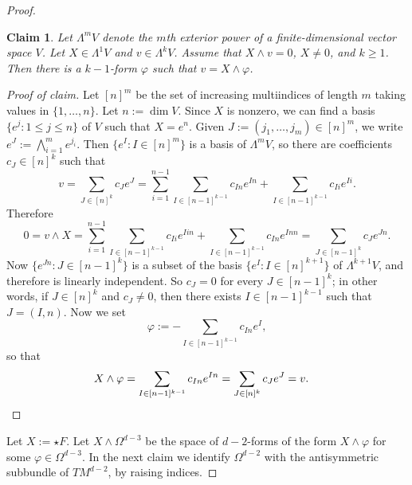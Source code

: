 \documentclass[reqno,11pt]{amsart}
\newtheorem{claim}{Claim}[theorem]
\theoremstyle{definition}
\numberwithin{equation}{section}
\begin{document}
\begin{proof}
\begin{claim}\label{exterior splitting lemma}
Let $\Lambda^m V$ denote the $m$th exterior power of a finite-dimensional vector space $V$.
Let $X \in \Lambda^1 V$ and $v \in \Lambda^k V$.
Assume that $X \wedge v = 0$, $X \neq 0$, and $k \geq 1$.
Then there is a $k - 1$-form $\varphi$ such that $v = X \wedge \varphi$.
\end{claim}
\begin{proof}[Proof of claim]
Let $[n]^m$ be the set of increasing multiindices of length $m$ taking values in $\{1, \dots, n\}$.
Let $n := \dim V$.
Since $X$ is nonzero, we can find a basis $\{e^j: 1 \leq j \leq n\}$ of $V$ such that $X = e^n$.
Given $J := (j_1, \dots, j_m) \in [n]^m$, we write $e^J := \bigwedge_{i=1}^m e^{j_i}$.
Then $\{e^I: I \in [n]^m\}$ is a basis of $\Lambda^m V$, so there are coefficients $c_J \in [n]^k$ such that
$$v = \sum_{J \in [n]^k} c_J e^J = \sum_{i=1}^{n - 1} \sum_{I \in [n - 1]^{k - 1}} c_{In} e^{In} + \sum_{I \in [n - 1]^{k - 1}} c_{Ii} e^{Ii}.$$
Therefore 
$$0 = v \wedge X = \sum_{i=1}^{n - 1} \sum_{I \in [n - 1]^{k - 1}} c_{Ii} e^{Iin} + \sum_{I \in [n - 1]^{k - 1}} c_{In} e^{Inn} = \sum_{J \in [n - 1]^k} c_J e^{Jn}.$$
Now $\{e^{Jn}: J \in [n-1]^k\}$ is a subset of the basis $\{e^I: I \in [n]^{k + 1}\}$ of $\Lambda^{k + 1} V$, and therefore is linearly independent.
So $c_J = 0$ for every $J \in [n - 1]^k$; in other words, if $J \in [n]^k$ and $c_J \neq 0$, then there exists $I \in [n - 1]^{k - 1}$ such that $J = (I, n)$.
Now we set
$$\varphi := -\sum_{I \in [n - 1]^{k - 1}} c_{In} e^I,$$
so that 
\begin{align*} 
X \wedge \varphi &= \sum_{I \in [n - 1]^{k - 1}} c_{In} e^{In} = \sum_{J \in [n]^k} c_J e^J = v. \qedhere 
\end{align*}
\end{proof}

Let $X := \star F$.
Let $X \wedge \Omega^{d - 3}$ be the space of $d - 2$-forms of the form $X \wedge \varphi$ for some $\varphi \in \Omega^{d - 3}$.
In the next claim we identify $\Omega^{d - 2}$ with the antisymmetric subbundle of $TM^{d - 2}$, by raising indices.


\end{proof}
\end{document}
